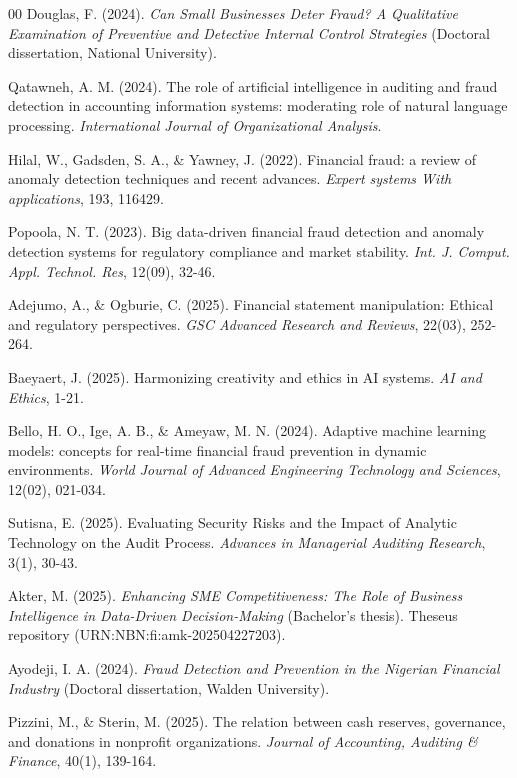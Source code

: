 \documentclass[conference]{IEEEtran}
\begin{document}
\begin{thebibliography}{00}
 Douglas, F. (2024). \emph{Can Small Businesses Deter Fraud? A Qualitative Examination of Preventive and Detective Internal Control Strategies} (Doctoral dissertation, National University).

 Qatawneh, A. M. (2024). The role of artificial intelligence in auditing and fraud detection in accounting information systems: moderating role of natural language processing. \emph{International Journal of Organizational Analysis}.

 Hilal, W., Gadsden, S. A., \& Yawney, J. (2022). Financial fraud: a review of anomaly detection techniques and recent advances. \emph{Expert systems With applications}, 193, 116429.

 Popoola, N. T. (2023). Big data-driven financial fraud detection and anomaly detection systems for regulatory compliance and market stability. \emph{Int. J. Comput. Appl. Technol. Res}, 12(09), 32-46.

 Adejumo, A., \& Ogburie, C. (2025). Financial statement manipulation: Ethical and regulatory perspectives. \emph{GSC Advanced Research and Reviews}, 22(03), 252-264.

 Baeyaert, J. (2025). Harmonizing creativity and ethics in AI systems. \emph{AI and Ethics}, 1-21.

 Bello, H. O., Ige, A. B., \& Ameyaw, M. N. (2024). Adaptive machine learning models: concepts for real-time financial fraud prevention in dynamic environments. \emph{World Journal of Advanced Engineering Technology and Sciences}, 12(02), 021-034.

 Sutisna, E. (2025). Evaluating Security Risks and the Impact of Analytic Technology on the Audit Process. \emph{Advances in Managerial Auditing Research}, 3(1), 30-43.

 Akter, M. (2025). \emph{Enhancing SME Competitiveness: The Role of Business Intelligence in Data-Driven Decision-Making} (Bachelor's thesis). Theseus repository (URN:NBN:fi:amk-202504227203).

 Ayodeji, I. A. (2024). \emph{Fraud Detection and Prevention in the Nigerian Financial Industry} (Doctoral dissertation, Walden University).

 Pizzini, M., \& Sterin, M. (2025). The relation between cash reserves, governance, and donations in nonprofit organizations. \emph{Journal of Accounting, Auditing \& Finance}, 40(1), 139-164.


\end{thebibliography}
\end{document}
